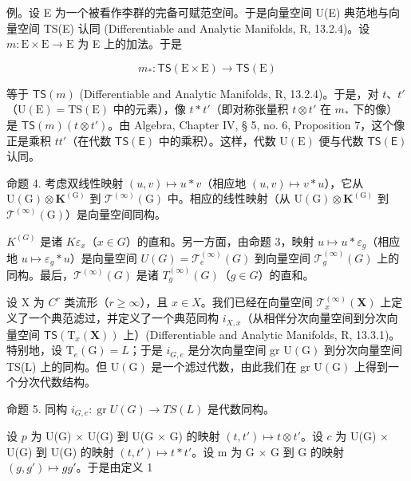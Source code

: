 例。设 E 为一个被看作李群的完备可赋范空间。于是向量空间 U(E) 典范地与向量空间 TS(E) 认同 (Differentiable and Analytic Manifolds, R, 13.2.4)。设 \(m: \mathrm{E} \times \mathrm{E} \to \mathrm{E}\) 为 E 上的加法。于是

\[
m _ {*} \colon \mathsf {T S} (\mathrm{E} \times \mathrm{E}) \rightarrow \mathsf {T S} (\mathrm{E})
\]

等于 \(\mathsf{TS}(m)\) (Differentiable and Analytic Manifolds, R, 13.2.4)。于是，对 \(t\)、\(t'\)（\(\mathrm{U(E)} = \mathrm{TS(E)}\) 中的元素），像 \(t * t'\)（即对称张量积 \(t \otimes t'\) 在 \(m_*\) 下的像）是 \(\mathsf{TS}(m)(t \otimes t')\)。由 Algebra, Chapter IV, § 5, no. 6, Proposition 7，这个像正是乘积 \(tt'\)（在代数 \(\mathsf{TS(E)}\) 中的乘积）。这样，代数 \(\mathrm{U(E)}\) 便与代数 \(\mathsf{TS(E)}\) 认同。

命题 4. 考虑双线性映射 \((u,v)\mapsto u*v\)（相应地 \((u,v)\mapsto v*u\)），它从 \(\mathrm{U}(\mathrm{G})\otimes \mathbf{K}^{(\mathrm{G})}\) 到 \(\mathcal{T}^{(\infty)}(\mathrm{G})\) 中。相应的线性映射（从 \(\mathrm{U}(\mathrm{G})\otimes \mathbf{K}^{(\mathrm{G})}\) 到 \(\mathcal{T}^{(\infty)}(\mathrm{G})\)）是向量空间同构。

\(K^{(G)}\) 是诸 \(K\varepsilon_{x}\)（\(x\in G\)）的直和。另一方面，由命题 3，映射 \(u\mapsto u*\varepsilon_{g}\)（相应地 \(u\mapsto\varepsilon_{g}*u\)）是向量空间 \(U(G)=\mathcal{T}_{e}^{(\infty)}(G)\) 到向量空间 \(\mathcal{T}_{g}^{(\infty)}(G)\) 上的同构。最后，\(\mathcal{T}^{(\infty)}(G)\) 是诸 \(T_{g}^{(\infty)}(G)\)（\(g\in G\)）的直和。

设 X 为 \(C^{r}\) 类流形（\(r \geqslant \infty\)），且 \(x \in X\)。我们已经在向量空间 \(\mathcal{T}_{x}^{(\infty)}(\mathbf{X})\) 上定义了一个典范滤过，并定义了一个典范同构 \(i_{X,x}\)（从相伴分次向量空间到分次向量空间 \(\mathsf{TS}(\mathrm{T}_{x}(\mathbf{X}))\) 上）(Differentiable and Analytic Manifolds, R, 13.3.1)。特别地，设 \(\mathrm{T}_{e}(\mathrm{G}) = L\)；于是 \(i_{G,e}\) 是分次向量空间 gr \(\mathrm{U}(\mathrm{G})\) 到分次向量空间 TS(L) 上的同构。但 \(\mathrm{U}(\mathrm{G})\) 是一个滤过代数，由此我们在 gr \(\mathrm{U}(\mathrm{G})\) 上得到一个分次代数结构。

命题 5. 同构 \(i_{G,e} \colon \operatorname{gr} U(G) \to TS(L)\) 是代数同构。

设 \(p\) 为 U(G) × U(G) 到 U(G × G) 的映射 \((t, t') \mapsto t \otimes t'\)。设 \(c\) 为 U(G) × U(G) 到 U(G) 的映射 \((t, t') \mapsto t * t'\)。设 m 为 G × G 到 G 的映射 \((g, g') \mapsto gg'\)。于是由定义 1

